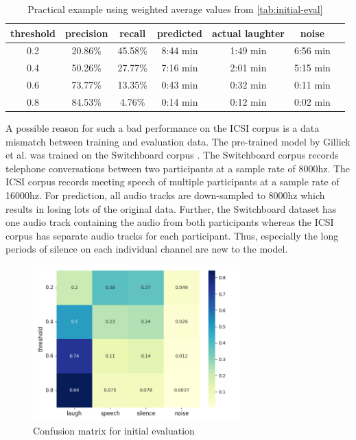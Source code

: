 \documentclass[bsc,frontabs,parskip,deptreport]{infthesis}
\begin{document}
\begin{table}[]
    \centering
    \begin{tabular}{|c|c|c|c|c|c|c|}
      \hline
      threshold & precision & recall & predicted & actual laughter & noise \\
      \hline
      0.2 &  20.86\% & 45.58\% & 8:44 min & 1:49 min & 6:56 min \\
      0.4 &  50.26\% & 27.77\% & 7:16 min & 2:01 min & 5:15 min \\
      0.6 &  73.77\% & 13.35\% & 0:43 min & 0:32 min & 0:11 min \\
      0.8 &  84.53\% & 4.76\% & 0:14 min & 0:12 min & 0:02 min \\
      \hline
    \end{tabular}
    \caption{Practical example using weighted average values from \autoref{tab:initial-eval}}
    \label{tab:practical-example}
\end{table}


A possible reason for such a bad performance on the ICSI corpus is a data mismatch between training and evaluation data. The pre-trained model by Gillick et al. \citep{gillick2021robust} was trained on the Switchboard corpus \citep{switchboard-corpus}. The Switchboard corpus records telephone conversations between two participants at a sample rate of 8000hz. The ICSI corpus records meeting speech of multiple participants at a sample rate of 16000hz. For prediction, all audio tracks are down-sampled to 8000hz which results in losing lots of the original data. 
Further, the Switchboard dataset has one audio track containing the audio from both participants whereas the ICSI corpus has separate audio tracks for each participant. Thus, especially the long periods of silence on each individual channel are new to the model. 

\begin{figure}[h!]
    \centering
    \includegraphics[width=8cm]{imgs/conf_matrix/init_eval_all.png}
    \caption{Confusion matrix for initial evaluation}
    \label{fig:initial-conf-matrix}
\end{figure}
\end{document}
